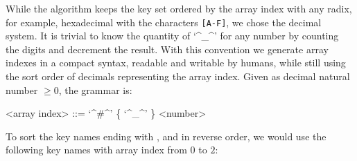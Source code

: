 
While the algorithm keeps the key set ordered by the array index with any radix, for example, hexadecimal with the characters \verb+[A-F]+, we chose the decimal system.
It is trivial to know the quantity of \lq^_^' for any number by counting the digits and decrement the result.
With this convention we generate array indexes in a compact syntax, readable and writable by humans, while still using the sort order of decimals representing the array index.
Given  as decimal natural number $\geq 0$, the grammar is:
\begin{grammar}
<array index> ::= \lq^#^' \{ \lq^_^' \} <number>
\end{grammar}


\phantom{}

\begin{example}
To sort the key names ending with ,  and  in reverse order, we would use the following key names with array index from $0$ to $2$:
\par
{}
\phantom{}
\end{example}























